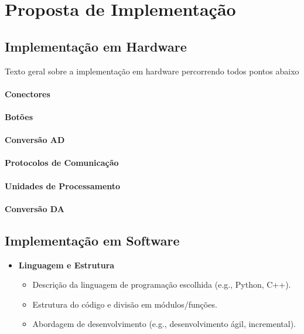     \section{Proposta de Implementação}

    \subsection{Implementação em Hardware}

    Texto geral sobre a implementação em hardware percorrendo todos pontos abaixo

    \paragraph{Conectores}
    \paragraph{Botões}
    \paragraph{Conversão AD}
    \paragraph{Protocolos de Comunicação}
    \paragraph{Unidades de Processamento}
    \paragraph{Conversão DA}
    
    
    \subsection{Implementação em Software}
    
    \begin{itemize}
        \item \textbf{Linguagem e Estrutura}
        \begin{itemize}
            \item Descrição da linguagem de programação escolhida (e.g., Python, C++).
            \item Estrutura do código e divisão em módulos/funções.
            \item Abordagem de desenvolvimento (e.g., desenvolvimento ágil, incremental).
        \end{itemize}
    \end{itemize}
    
